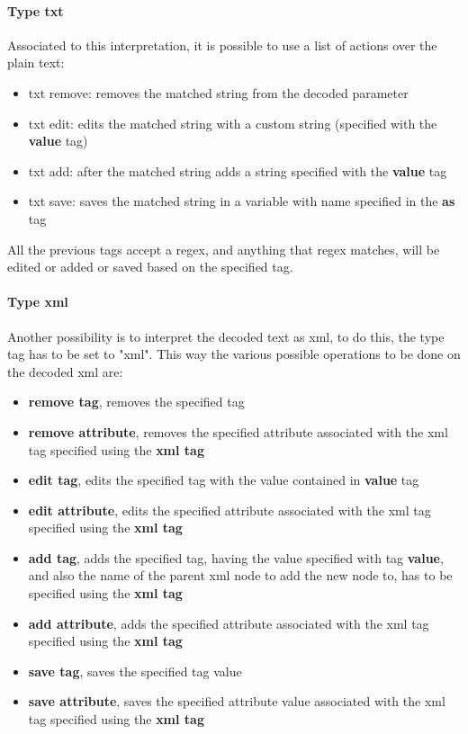 \paragraph{Type txt}
Associated to this interpretation, it is possible to use a list of actions over the plain text:
\begin{itemize}
    \item txt remove: removes the matched string from the decoded parameter
    \item txt edit: edits the matched string with a custom string (specified with the \textbf{value} tag)
    \item txt add: after the matched string adds a string specified with the \textbf{value} tag
    \item txt save: saves the matched string in a variable with name specified in the \textbf{as} tag
\end{itemize}
All the previous tags accept a regex, and anything that regex matches, will be edited or added or saved based on the specified tag.

\paragraph{Type xml}
Another possibility is to interpret the decoded text as xml, to do this, the type tag has to be set to "xml".
This way the various possible operations to be done on the decoded xml are:
\begin{itemize}
    \item \textbf{remove tag}, removes the specified tag
    \item \textbf{remove attribute}, removes the specified attribute associated with the xml tag specified using the \textbf{xml tag}
    \item \textbf{edit tag}, edits the specified tag with the value contained in \textbf{value} tag 
    \item \textbf{edit attribute}, edits the specified attribute associated with the xml tag specified using the \textbf{xml tag}
    \item \textbf{add tag}, adds the specified tag, having the value specified with tag \textbf{value}, and also the name of the parent xml node to add the new node to, has to be specified using the \textbf{xml tag}
    \item \textbf{add attribute}, adds the specified attribute associated with the xml tag specified using the \textbf{xml tag}
    \item \textbf{save tag}, saves the specified tag value
    \item \textbf{save attribute}, saves the specified attribute value associated with the xml tag specified using the \textbf{xml tag}
\end{itemize}

